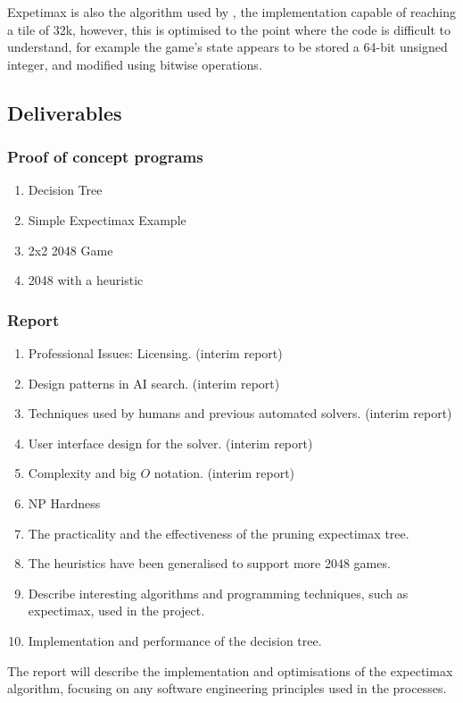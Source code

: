 \documentclass{article}
\begin{document}
Expetimax is also the algorithm used by \cite{_16k2048ai}, the implementation capable of reaching a tile of 32k, however, this is optimised to the point where the code is difficult to understand, for example the game's state appears to be stored a 64-bit unsigned integer, and modified using bitwise operations.

\subsection{Deliverables}
\label{subsec:deliverable}
\subsubsection{Proof of concept programs}
\begin{enumerate}
    \item Decision Tree
    \item Simple Expectimax Example
    \item 2x2 2048 Game
    \item 2048 with a heuristic
\end{enumerate}
\subsubsection{Report}
\begin{enumerate}
    \item Professional Issues: Licensing. (interim report)
    \item Design patterns in AI search. (interim report)
    \item Techniques used by humans and previous automated solvers. (interim report)
    \item User interface design for the solver. (interim report)
    \item Complexity and big $O$ notation. (interim report)
    \item NP Hardness
    \item The practicality and the effectiveness of the pruning expectimax tree.
    \item The heuristics have been generalised to support more 2048 games.
    \item Describe interesting algorithms and programming techniques, such as expectimax, used in the project.
    \item Implementation and performance of the decision tree.    
\end{enumerate}
The report will describe the implementation and optimisations of the expectimax algorithm, focusing on any software engineering principles used in the processes. 
\end{document}

